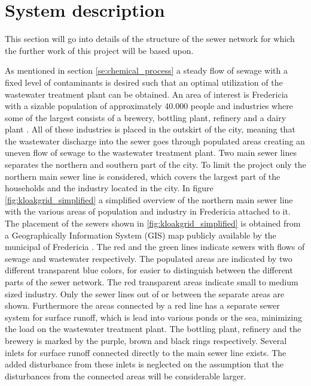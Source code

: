\chapter{System description}\label{se:system_description}
This section will go into details of the structure of the sewer network for which the further work of this project will be based upon.

As mentioned in section \ref{se:chemical_process} a steady flow of sewage with a fixed level of contaminants is desired such that an optimal utilization of the wastewater treatment plant can be obtained. An area of interest is Fredericia with a sizable population of approximately 40.000 people and industries where some of the largest consists of a brewery, bottling plant, refinery and a dairy plant \cite{Statistic_Denmark}. All of these industries is placed in the outskirt of the city, meaning that the wastewater discharge into the sewer goes through populated areas creating an uneven flow of sewage to the wastewater treatment plant. Two main sewer lines separates the northern and southern part of the city. To limit the project only the northern main sewer line is considered, which covers the largest part of the households and the industry located in the city.%
In figure \ref{fig:kloakgrid_simplified} a simplified overview of the northern main sewer line with the various areas of population and industry in Fredericia attached to it. The placement of the sewers shown in \ref{fig:kloakgrid_simplified} is obtained from a Geographically Information System (GIS) map publicly available by the municipal of Fredericia \cite{GIS_kort}. The red and the green lines indicate sewers with flows of sewage and wastewater respectively. The populated areas are indicated by two different transparent blue colors, for easier to distinguish between the different parts of the sewer network. The red transparent areas indicate small to medium sized industry. 
Only the sewer lines out of or between the separate areas are shown. Furthermore the areas connected by a red line has a separate sewer system for surface runoff, which is lead into various ponds or the sea, minimizing the load on the wastewater treatment plant.
The bottling plant, refinery and the brewery is marked by the purple, brown and black rings respectively. Several inlets for surface runoff connected directly to the main sewer line exists. The added disturbance from these inlets is neglected on the assumption that the disturbances from the connected areas will be considerable larger.  



